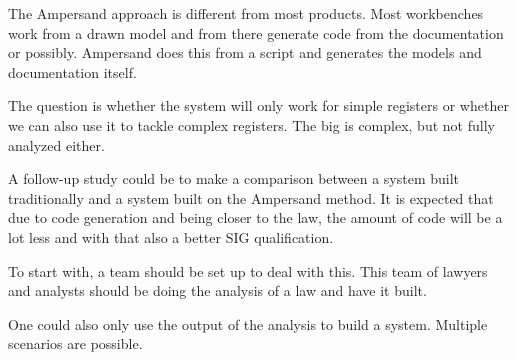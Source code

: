 {The Ampersand approach is different from most products. 
Most workbenches work from a drawn model and from there generate code from the documentation or possibly. 
Ampersand does this from a script and generates the models and documentation itself.}

{The question is whether the system will only work for simple registers or whether we can also use it to tackle complex registers.
The \acrshort{big} is complex, but not fully analyzed either.}

{A follow-up study could be to make a comparison between a system built traditionally and a system built on the Ampersand method. 
It is expected that due to code generation and being closer to the law, the amount of code will be a lot less and with that also a better SIG qualification.}

{To start with, a team should be set up to deal with this. 
This team of lawyers and analysts should be doing the analysis of a law and have it built.}

{One could also only use the output of the analysis to build a system. 
Multiple scenarios are possible.}